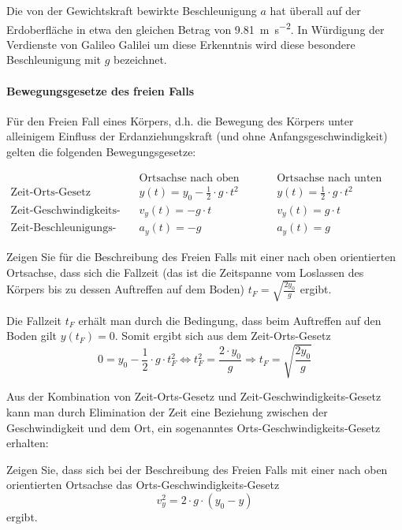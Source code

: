 Die von der Gewichtskraft bewirkte Beschleunigung $a$  hat überall auf der Erdoberfläche in etwa den gleichen Betrag von \SI{9.81}{\metre \per \second \squared}. In Würdigung der Verdienste von Galileo Galilei um diese Erkenntnis wird diese besondere Beschleunigung mit $g$ bezeichnet.

\paragraph{Bewegungsgesetze des freien Falls}
Für den Freien Fall eines Körpers, d.h. die Bewegung des Körpers unter alleinigem Einfluss der Erdanziehungskraft (und ohne Anfangsgeschwindigkeit) gelten die folgenden Bewegungsgesetze:
\begin{fullwidth}
\begin{eqnarray*}
    & \text{Ortsachse nach oben orientiert} & \text{Ortsachse nach unten orientiert} \\
    \text{Zeit-Orts-Gesetz} & y(t) = y_{0} - \frac{1}{2} \cdot g \cdot t^{2} & y(t) =\frac{1}{2} \cdot g \cdot t^{2} \\
    \text{Zeit-Geschwindigkeits-Gesetz} & v_{y}(t) = -g \cdot t & v_{y}(t) = g \cdot t \\
    \text{Zeit-Beschleunigungs-Gesetz} & a_{y}(t) = -g & a_{y}(t)=g 
\end{eqnarray*}
\end{fullwidth}
\begin{example}
Zeigen Sie für die Beschreibung des Freien Falls mit einer nach oben orientierten Ortsachse, dass sich die Fallzeit (das ist die Zeitspanne vom Loslassen des Körpers bis zu dessen Auftreffen auf dem Boden) $t_{F} = \sqrt{\frac{2 y_{0}}{g}}$ ergibt.
\end{example}

\begin{solution}
Die Fallzeit $t_{F}$ erhält man durch die Bedingung, dass beim Auftreffen auf den Boden gilt $y(t_{F})=0$. Somit ergibt sich aus dem Zeit-Orts-Gesetz
\[ 0 = y_{0} - \frac{1}{2} \cdot g \cdot t_{F}^{2} \Leftrightarrow t_{F}^{2} = \frac{2 \cdot y_{0}}{g} \Rightarrow t_{F} = \sqrt{\frac{2 y_{0}}{g}}\]
\end{solution}

Aus der Kombination von Zeit-Orts-Gesetz und Zeit-Geschwindigkeits-Gesetz kann man durch Elimination der Zeit eine Beziehung zwischen der Geschwindigkeit und dem Ort, ein sogenanntes Orts-Geschwindigkeits-Gesetz erhalten:
\begin{example}
Zeigen Sie, dass sich bei der Beschreibung des Freien Falls mit einer nach oben orientierten Ortsachse das Orts-Geschwindigkeits-Gesetz
\[ v_{y}^{2} = 2 \cdot g \cdot (y_{0} - y) \]
ergibt.
\end{example}

